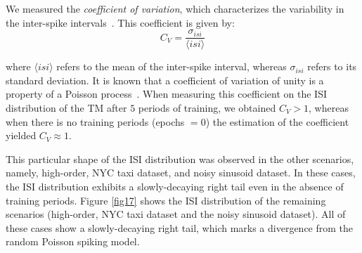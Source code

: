 \documentclass[11pt,letterpaper]{article}
\begin{document}
		    We measured the \emph{coefficient of variation}, which characterizes the variability in the inter-spike
		    intervals~\cite{heeger2000poisson}.
		    This coefficient is given by:
		    \begin{equation}
		        C_{V}= \frac{\sigma_{isi}}{\langle isi\rangle}
		    \end{equation}
		    
		    \noindent where $\langle isi\rangle$ refers to the mean of the inter-spike interval, whereas
		    $\sigma_{isi}$ refers to its standard deviation.
		    It is known that a coefficient of variation of unity is a property of a Poisson 
		    process~\cite{heeger2000poisson}.
		    When measuring this coefficient on the ISI distribution of the TM after $5$ periods of 
		    training, we obtained $C_{V} > 1$, whereas when there is no training periods
		    (epochs $ = 0$) the estimation of the coefficient yielded $C_{V} \approx 1$.
		    
		    This particular shape of the ISI distribution was observed in the other scenarios, namely,
		    high-order, NYC taxi dataset, and noisy sinusoid dataset.
		    In these cases, the ISI distribution exhibits a slowly-decaying right tail even in the absence
		    of training periods.
		    Figure \ref{fig17} shows the ISI distribution of the remaining scenarios (high-order, NYC taxi dataset
		    and the noisy sinusoid dataset).
		    All of these cases show a slowly-decaying right tail, which marks a divergence from the random Poisson
		    spiking model.
		    
\end{document}

